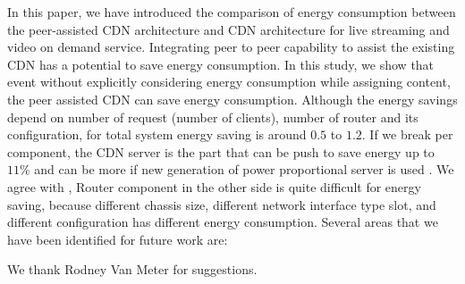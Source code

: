 \documentclass[JIP]{ipsj}
\begin{document}
In this paper, we have introduced the comparison of energy consumption between the peer-assisted CDN architecture and CDN architecture for live streaming and video on demand service.
Integrating peer to peer capability to assist the existing CDN has a potential to save energy consumption.
In this study, we show that event without explicitly considering energy consumption while assigning content, the peer assisted CDN can save energy consumption.
Although the energy savings depend on number of request (number of clients), number of router and its configuration, for total system energy saving is around $0.5$ to $1.2$.
If we break per component, the CDN server is the part that can be push to save energy up to $11\%$ and can be more if new generation of power proportional server is used \cite{Krioukov:2011:NDI:1925861.1925878}.
We agree with \cite{4509688}, Router component in the other side is quite difficult for energy saving, because different chassis size, different network interface type slot, and different configuration has different energy consumption.
Several areas that we have been identified for future work are:  




\begin{acknowledgment}
We thank Rodney Van Meter for suggestions.
\end{acknowledgment}




\begin{biography}

%
%
%
\end{biography}
\end{document}
